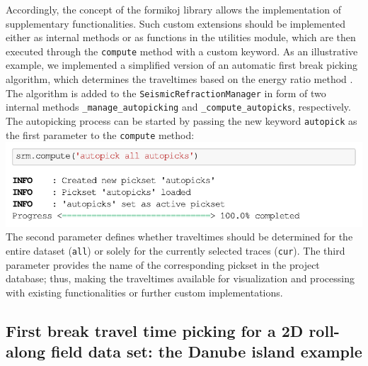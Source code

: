 \documentclass[a4paper,fleqn]{cas-sc}
\begin{document}
Accordingly, the concept of the formikoj library allows the implementation of supplementary functionalities. 
Such custom extensions should be implemented either as internal methods or as functions in the utilities module, which are then executed through the \texttt{compute} method with a custom keyword. 
As an illustrative example, we implemented a simplified version of an automatic first break picking algorithm, which determines the traveltimes based on the energy ratio method \citep[e.g.,][]{earle1994}. The algorithm is added to the \texttt{SeismicRefractionManager} in form of two internal methods \texttt{\_manage\_autopicking} and \texttt{\_compute\_autopicks}, respectively. The autopicking process can be started by passing the new keyword \texttt{autopick} as the first parameter to the \texttt{compute} method:
\newline
\includegraphics[width=.5\textwidth]{./figures/autopicking.pdf}
\newline
The second parameter defines whether traveltimes should be determined for 
the entire dataset (\texttt{all}) or solely for the currently selected traces (\texttt{cur}). The third parameter provides the name of the corresponding pickset in the project database; thus, making the traveltimes available for visualization and processing with existing functionalities or further custom implementations.

\subsection{First break travel time picking for a 2D roll-along field data set: the Danube island example}
\end{document}
